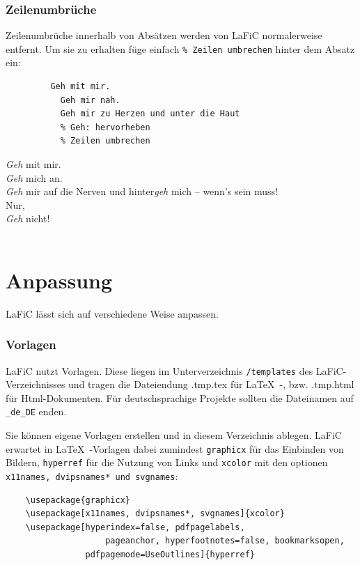 \documentclass{scrartcl}
\begin{document}
\section{Zeilenumbrüche}

{Zeilenumbrüche  innerhalb von Absätzen werden von LaFiC normalerweise entfernt. Um sie zu erhalten füge einfach \texttt{\% Zeilen umbrechen} hinter dem Absatz ein:\\}

\begin{verbatim}
  	     Geh mit mir.
	       Geh mir nah.
	       Geh mir zu Herzen und unter die Haut
	       % Geh: hervorheben
	       % Zeilen umbrechen
\end{verbatim}


{\emph{Geh} mit mir.\\
\emph{Geh} mich an.\\
\emph{Geh} mir auf die Nerven und hinter\emph{geh} mich – wenn's sein muss!\\
Nur,\\
\emph{Geh} nicht!\\\\}

\part{Anpassung}

{LaFiC lässt sich auf verschiedene Weise anpassen.\\}

\section{Vorlagen}

{LaFiC nutzt Vorlagen. Diese liegen im Unterverzeichnis
\texttt{/templates} des LaFiC-Verzeichnisses und tragen die
Dateiendung .tmp.tex für \LaTeX\ -, bzw. .tmp.html für
Html-Dokumenten. Für deutschsprachige Projekte sollten die
Dateinamen auf \texttt{\_de\_DE} enden.\\}

{Sie können eigene Vorlagen erstellen und in diesem
Verzeichnis ablegen. LaFiC erwartet in \LaTeX\ -Vorlagen
dabei zumindest \texttt{graphicx} für das Einbinden von Bildern,
\texttt{hyperref} für die Nutzung von Links und \texttt{xcolor} mit den
optionen \texttt{x11names, dvipsnames* und svgnames}:\\}

\begin{verbatim}
	\usepackage{graphicx}
	\usepackage[x11names, dvipsnames*, svgnames]{xcolor}
	\usepackage[hyperindex=false, pdfpagelabels,
                    pageanchor, hyperfootnotes=false, bookmarksopen,
	    	    pdfpagemode=UseOutlines]{hyperref}
\end{verbatim}
\end{document}
